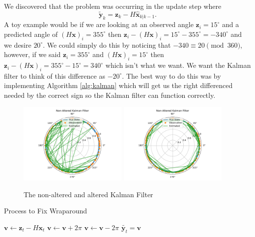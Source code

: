 \documentclass[11pt]{amsart}
\begin{document}
We discovered that the problem was occurring in the update step where \[\mathbf{\tilde{y}}_k = \mathbf{z}_k - H\mathbf{\hat{x}}_{k|k-1}.\]
A toy example would be if we are looking at an observed angle $\mathbf{z}_i = 15^{\circ}$ and a predicted angle of $(H\mathbf{x})_i = 355^{\circ}$ 
then $\mathbf{z}_i - (H\mathbf{x})_i = 15^{\circ} - 355^{\circ} = -340^{\circ}$ and we desire $20^{\circ}$. We could simply do this by noticing that $-340 \equiv 20 \pmod {360}$,
however, if we said $\mathbf{z}_i=355^{\circ}$ and $(H\mathbf{x})_i = 15^{\circ}$ then $\mathbf{z}_i - (H\mathbf{x})_i = 355^{\circ} - 15^{\circ} = 340^{\circ}$ which isn't what we want.
We want the Kalman filter to think of this difference as $-20^{\circ}$. The best way to do this was by implementing Algorithm \ref{alg:kalman} which will get us the right differenced needed by 
the correct sign so the Kalman filter can function correctly.

\begin{figure}[htp]
    \centering
    \includegraphics[width=0.47\textwidth]{non_altered_kalman.pdf}\hfill
    \includegraphics[width=0.47\textwidth]{altered_kalman.pdf}\hfill
    \caption{The non-altered and altered Kalman Filter}
    \label{fig:simple_kalman}
\end{figure}



\begin{algorithm}
    \caption{Process to Fix Wraparound}\label{alg:kalman}    
    \begin{algorithmic}
        \State $\mathbf{v} \gets \mathbf{z}_t - H\mathbf{x}_t$
            \State $\mathbf{v} \gets \mathbf{v} + 2\pi$
            \State $\mathbf{v} \gets \mathbf{v} - 2\pi$
        \EndIf 
        \State $\tilde{\mathbf{y}_t} = \mathbf{v}$ 
        \end{algorithmic}
    \end{algorithm}
\end{document}
